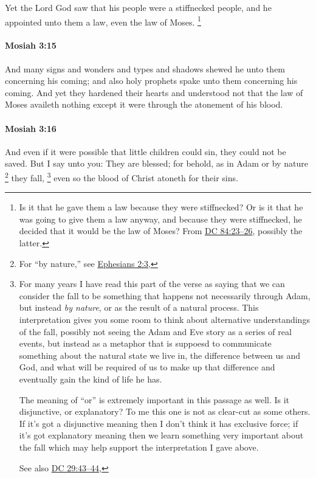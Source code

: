 			Yet the Lord God saw that his people were a stiffnecked people,
			and he appointed unto them a law, even the law of Moses.%
				\footnote{%
					\label{MOSIAH-3-14-NOTE-law}%
					Is it that he gave them a law because they were stiffnecked? Or is it that he was going to give them a law anyway, and because they were stiffnecked, he decided that it would be the law of Moses? From \hyperref[DC84-23]{DC 84:23--26}, possibly the latter.
					}

		\paragraph{Mosiah 3:15} %
			\label{MOSIAH-3-15}

			And many signs and wonders and types and shadows
			shewed he unto them concerning his coming;
			and also holy prophets spake unto them concerning his coming.
			And yet they hardened their hearts and understood not
			that the law of Moses availeth nothing
			except it were through the atonement of his blood.

		\paragraph{Mosiah 3:16} %
			\label{MOSIAH-3-16}

			And even if it were possible that little children could sin,
			they could not be saved.
			But I say unto you:
			They are blessed;
			for behold, as in Adam or by nature%
				\footnote{%
					For ``by nature,'' see \hyperref[EPHESIANS-2-3]{Ephesians 2:3}, 
					}
			they fall,%
				\footnote{%
					For many years I have read this part of the verse as saying that we can consider the fall to be something that happens not necessarily through Adam, but instead \textit{by nature}, or as the result of a natural process. This interpretation gives you some room to think about alternative understandings of the fall, possibly not seeing the Adam and Eve story as a series of real events, but instead as a metaphor that is suppoesd to communicate something about the natural state we live in, the difference between us and God, and what will be required of us to make up that difference and eventually gain the kind of life he has.
					
					The meaning of ``or'' is extremely important in this passage as well. Is it disjunctive, or explanatory? To me this one is not as clear-cut as some others. If it's got a disjunctive meaning then I don't think it has exclusive force; if it's got explanatory meaning then we learn something very important about the fall which may help support the interpretation I gave above.
					
					See also \hyperref[DC29-43]{DC 29:43--44},
					}
			even so the blood of Christ atoneth for their sins.

